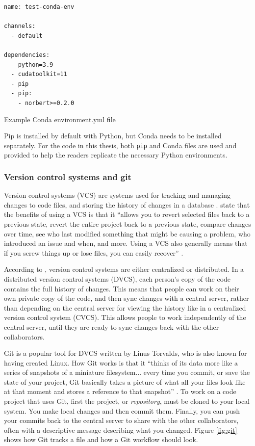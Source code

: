 \documentclass[report.tex]{subfiles}
\begin{document}
\begin{listing}[ht]
\centering
\begin{BVerbatim}
name: test-conda-env

channels:
  - default

dependencies:
  - python=3.9
  - cudatoolkit=11
  - pip
  - pip:
    - norbert>=0.2.0
\end{BVerbatim}
	\caption{Example Conda environment.yml file}
	\label{lst:condayml}
\end{listing}

Pip is installed by default with Python, but Conda needs to be installed separately. For the code in this thesis, both \Verb#pip# and Conda files are used and provided to help the readers replicate the necessary Python environments.

\subsubsection{Version control systems and git}
\label{sec:gitvcs}

Version control systems (VCS) are systems used for tracking and managing changes to code files, and storing the history of changes in a database \parencite{gitbook}. \citeauthor{gitbook} state that the benefits of using a VCS is that it ``allows you to revert selected files back to a previous state, revert the entire project back to a previous state, compare changes over time, see who last modified something that might be causing a problem, who introduced an issue and when, and more. Using a VCS also generally means that if you screw things up or lose files, you can easily recover'' \parencite[1]{gitbook}.

According to \textcite{gitbook}, version control systems are either centralized or distributed. In a distributed version control systems (DVCS), each person's copy of the code contains the full history of changes. This means that people can work on their own private copy of the code, and then sync changes with a central server, rather than depending on the central server for viewing the history like in a centralized version control system (CVCS). This allows people to work independently of the central server, until they are ready to sync changes back with the other collaborators.

Git is a popular tool for DVCS written by Linus Torvalds, who is also known for having created Linux. How Git works is that it ``thinks of its data more like a series of snapshots of a miniature filesystem... every time you commit, or save the state of your project, Git basically takes a picture of what all your files look like at that moment and stores a reference to that snapshot'' \parencite[6]{gitbook}. To work on a code project that uses Git, first the project, or \textit{repository}, must be cloned to your local system. You make local changes and then commit them. Finally, you can push your commits back to the central server to share with the other collaborators, often with a descriptive message describing what you changed. Figure \ref{fig:git} shows how Git tracks a file and how a Git workflow should look.
\end{document}
